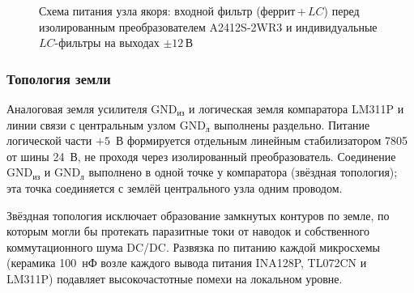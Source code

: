 \documentclass[a4paper,11pt]{article} %
\begin{document}
\begin{figure}[h!]
\centering
{}
\caption{Схема питания узла якоря: входной фильтр (феррит\,+\,$LC$) перед изолированным
преобразователем A2412S-2WR3 и индивидуальные $LC$-фильтры на выходах $\pm 12$\,В}
\label{fig:anchor-power}
\end{figure}

\subsubsection{Топология земли}

Аналоговая земля усилителя GND$_{\text{из}}$ и логическая земля компаратора LM311P
и линии связи с центральным узлом GND$_{\text{л}}$ выполнены раздельно. Питание
логической части $+5$~В формируется отдельным линейным стабилизатором 7805 от шины
24~В, не проходя через изолированный преобразователь. Соединение GND$_{\text{из}}$ и
GND$_{\text{л}}$ выполнено в одной точке у компаратора (звёздная топология); эта точка
соединяется с землёй центрального узла одним проводом.

Звёздная топология исключает образование замкнутых контуров по земле, по которым
могли бы протекать паразитные токи от наводок и собственного коммутационного шума
DC/DC. Развязка по питанию каждой микросхемы (керамика 100~нФ возле каждого вывода
питания INA128P, TL072CN и LM311P) подавляет высокочастотные помехи на локальном уровне.
\end{document}
